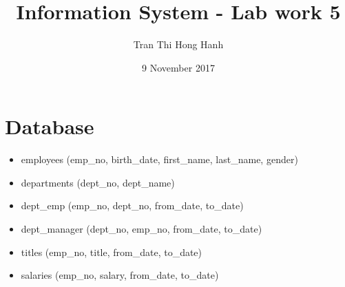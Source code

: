 \documentclass{article}
\title{Information System - Lab work 5}
\author{Tran Thi Hong Hanh}
\date{9 November 2017}
\begin{document}
\maketitle
\section*{Database}
\begin{itemize}
	\item employees (emp\_no, birth\_date, first\_name, last\_name, gender)
	\item departments (dept\_no, dept\_name)
	\item dept\_emp (emp\_no, dept\_no, from\_date, to\_date)
	\item dept\_manager (dept\_no, emp\_no, from\_date, to\_date)
	\item titles (emp\_no, title, from\_date, to\_date)
	\item salaries (emp\_no, salary, from\_date, to\_date)
\end{itemize}
\end{document}

